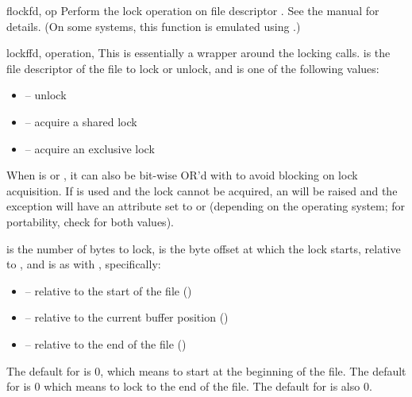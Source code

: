 \begin{funcdesc}{flock}{fd, op}
Perform the lock operation  on file descriptor .
See the \UNIX{} manual  for details.  (On some
systems, this function is emulated using .)
\end{funcdesc}

\begin{funcdesc}{lockf}{fd, operation,
    }
This is essentially a wrapper around the  locking
calls.   is the file descriptor of the file to lock or unlock,
and  is one of the following values:

\begin{itemize}
\item {} -- unlock
\item {} -- acquire a shared lock
\item {} -- acquire an exclusive lock
\end{itemize}

When  is  or , it
can also be bit-wise OR'd with  to avoid blocking on
lock acquisition.  If  is used and the lock cannot
be acquired, an  will be raised and the exception
will have an  attribute set to  or
 (depending on the operating system; for portability,
check for both values).

 is the number of bytes to lock,  is the byte
offset at which the lock starts, relative to , and
 is as with , specifically:

\begin{itemize}
\item {} -- relative to the start of the file
      ()
\item {} -- relative to the current buffer position
      ()
\item {} -- relative to the end of the file
      ()
\end{itemize}

The default for  is 0, which means to start at the
beginning of the file.  The default for  is 0 which means
to lock to the end of the file.  The default for  is also
0.
\end{funcdesc}

